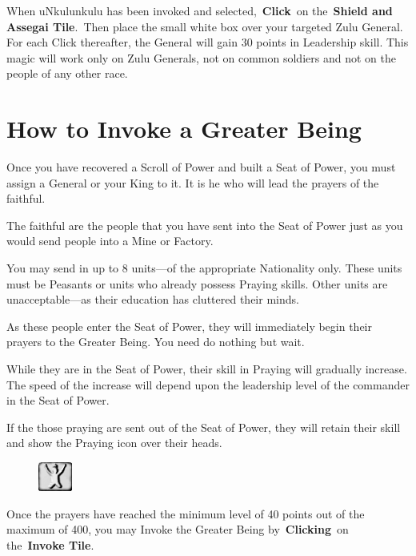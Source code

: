 When uNkulunkulu has been invoked and selected, \textbf{Click} on the \textbf{Shield and Assegai Tile}. Then place the small white box over your targeted Zulu General. For each Click thereafter, the General will gain 30 points in Leadership skill. This magic will work only on Zulu Generals, not on common soldiers and not on the people of any other race.

\section{How to Invoke a Greater Being}

Once you have recovered a Scroll of Power and built a Seat of Power, you must assign a General or your King to it. It is he who will lead the prayers of the faithful.

The faithful are the people that you have sent into the Seat of Power just as you would send people into a Mine or Factory.

You may send in up to 8 units---of the appropriate Nationality only. These units must be Peasants or units who already possess Praying skills. Other units are unacceptable---as their education has cluttered their minds.

As these people enter the Seat of Power, they will immediately begin their prayers to the Greater Being. You need do nothing but wait.

While they are in the Seat of Power, their skill in Praying will gradually increase. The speed of the increase will depend upon the leadership level of the commander in the Seat of Power.

If the those praying are sent out of the Seat of Power, they will retain their skill and show the Praying icon over their heads.

\begin{figure}
	\vspace{-20pt}
	\begin{center}
		\includegraphics[width=0.1\textwidth]{Tinvoke}
	\end{center}
	\vspace{-20pt}
\end{figure}


Once the prayers have reached the minimum level of 40 points out of the maximum of 400, you may Invoke the Greater Being by \textbf{Clicking} on the \textbf{Invoke Tile}.

